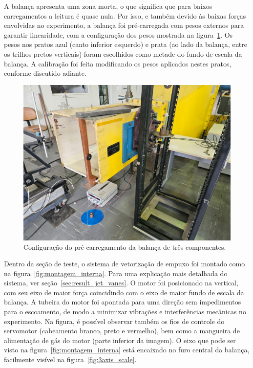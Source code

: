 A balança apresenta uma zona morta, o que significa que para baixos carregamentos a leitura é quase nula. Por isso, e também devido às baixas forças envolvidas no experimento, a balança foi pré-carregada com pesos externos para garantir linearidade, com a configuração dos pesos mostrada na figura~\ref{fig:pre_loading}. Os pesos nos pratos azul (canto inferior esquerdo) e prata (ao lado da balança, entre os trilhos pretos verticais) foram escolhidos como metade do fundo de escala da balança. A calibração foi feita modificando os pesos aplicados nestes pratos, conforme discutido adiante.

\begin{figure}[htbp]
    \centering
    \includegraphics[height=0.45\textheight]{img/montagem_externa.jpeg}
    \caption{Configuração do pré-carregamento da balança de três componentes.}\label{fig:pre_loading}
\end{figure}

Dentro da seção de teste, o sistema de vetorização de empuxo foi montado como na figura~\ref{fig:montagem_interna}. Para uma explicação mais detalhada do sistema, ver seção~\ref{sec:result_jet_vanes}. O motor foi posicionado na vertical, com seu eixo de maior força coincidindo com o eixo de maior fundo de escala da balança. A tubeira do motor foi apontada para uma direção sem impedimentos para o escoamento, de modo a minimizar vibrações e interferências mecânicas no experimento. Na figura, é possível observar também os fios de controle do servomotor (cabeamento branco, preto e vermelho), bem como a mangueira de alimentação de gás do motor (parte inferior da imagem). O eixo que pode ser visto na figura~\ref{fig:montagem_interna} está encaixado no furo central da balança, facilmente visível na figura~\ref{fig:3axis_scale}.

